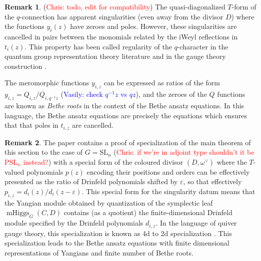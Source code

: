 \documentclass[11pt, oneside, reqno]{amsart}
\theoremstyle{definition} \newtheorem{definition}{Definition}[section]
\theoremstyle{definition} \newtheorem{remark}[definition]{Remark}
\theoremstyle{definition} \newtheorem{remarks}[definition]{Remarks}
\theoremstyle{definition} \newtheorem{question}[definition]{Question}
\theoremstyle{definition} \newtheorem*{note}{Note}
\theoremstyle{definition} \newtheorem{example}[definition]{Example}
\theoremstyle{definition} \newtheorem{examples}[definition]{Examples}
\newcommand{\mr}[1]{\mathrm{#1}}
\newcommand{\eps}{\varepsilon}
\newcommand{\SL}{\mathrm{SL}}
\DeclareMathOperator{\mhiggs}{mHiggs}
\newcommand{\chris}[1]{(\textcolor{red}{Chris: #1})}
\newcommand{\vasily}[1]{(\textcolor{blue}{Vasily: #1})}
\begin{document}
\begin{remark}
\chris{todo, edit for compatibility}
The quasi-diagonalized $T$-form of the $q$-connection has apparent singularities (even away from the divisor $D$)  where the functions $y_{i}(z)$ have zeroes and poles.  However, these singularities are cancelled in pairs between the monomials
 related by the iWeyl reflections in $t_{i}(z)$.
 This property has been called regularity of the $q$-character in the quantum group representation theory literature\cite{FrenkelReshetikhin1,FrenkelReshetikhin2} and in the gauge theory construction 
 \cite{NekrasovPestunShatashvili,Nekrasov:2015wsu,NekrasovPestun,Kimura:2015rgi}.
 
 The meromorphic functions $y_{i,z}$ can be expressed as ratios of the form $y_{i,z} = Q_{i,z}/Q_{i,q^{-1}z}$ \vasily{check $q^{-1} z$ vs $q z$}, and the zeroes of the $Q$ functions are known as \emph{Bethe roots} in the context of the Bethe ansatz equations.  In this language, the Bethe ansatz equations are precisely the equations which ensures that  that poles in $t_{i,z}$ are cancelled. 
\end{remark}


 \begin{remark}
The paper \cite{KoroteevSageZeitlin} contains a proof of specialization of the main theorem of this section to the case of $G = \SL_n$ \chris{if we're in adjoint type shouldn't it be $\mr{PSL}_n$ instead?} with a special form of the coloured divisor $(D,\omega^\vee)$ where the $T$-valued polynomials $p(z)$ encoding their positions and orders can be effectively presented as the ratio of Drinfeld polynomials shifted by $\eps$, so that effectively $p_{i,z} = d_{i}(z)/d_{i}(z - \eps)$.  This special form for the singularity datum means that the Yangian module obtained by quantization of the symplectic leaf $\mhiggs_G(C,D)$ contains (as a quotient) the finite-dimensional Drinfeld module specified by the Drinfeld polynomials $d_{i,z}$. In the language of quiver gauge theory, this specialization is known as 4d to 2d specialization \cite{ChenDoreyHollowoodLee, DoreyHollowoodLee}. This specialization leads to the Bethe ansatz equations with finite dimensional representations of Yangians and finite number of Bethe roots. 
\end{remark}
\end{document}

